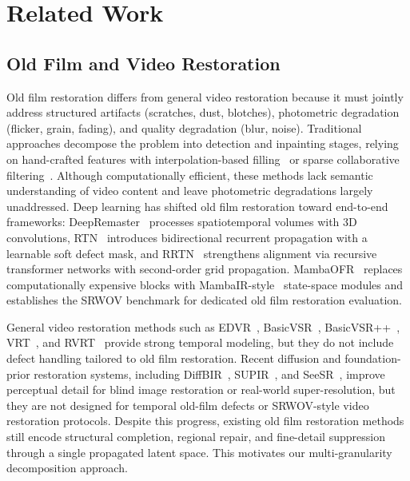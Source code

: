 \section{Related Work}
\label{sec:related}

\subsection{Old Film and Video Restoration}
\label{subsec:ofr}

Old film restoration differs from general video restoration because it must jointly address structured artifacts (scratches, dust, blotches), photometric degradation (flicker, grain, fading), and quality degradation (blur, noise). Traditional approaches decompose the problem into detection and inpainting stages, relying on hand-crafted features with interpolation-based filling~\cite{kokaram2004missing} or sparse collaborative filtering~\cite{dabov2007bm3d,he2013guided}. Although computationally efficient, these methods lack semantic understanding of video content and leave photometric degradations largely unaddressed. Deep learning has shifted old film restoration toward end-to-end frameworks: DeepRemaster~\cite{iizuka2019deepremaster} processes spatiotemporal volumes with 3D convolutions, RTN~\cite{wan2022rtn} introduces bidirectional recurrent propagation with a learnable soft defect mask, and RRTN~\cite{lin2024rrtn} strengthens alignment via recursive transformer networks with second-order grid propagation. MambaOFR~\cite{mao2025mambaofr} replaces computationally expensive blocks with MambaIR-style~\cite{guo2024mambair} state-space modules and establishes the SRWOV benchmark for dedicated old film restoration evaluation.

General video restoration methods such as EDVR~\cite{wang2019edvr}, BasicVSR~\cite{chan2021basicvsr}, BasicVSR++~\cite{chan2022basicvsrpp}, VRT~\cite{liang2024vrt}, and RVRT~\cite{liang2022rvrt} provide strong temporal modeling, but they do not include defect handling tailored to old film restoration. Recent diffusion and foundation-prior restoration systems, including DiffBIR~\cite{lin2024diffbir}, SUPIR~\cite{yu2024supir}, and SeeSR~\cite{wu2024seesr}, improve perceptual detail for blind image restoration or real-world super-resolution, but they are not designed for temporal old-film defects or SRWOV-style video restoration protocols. Despite this progress, existing old film restoration methods still encode structural completion, regional repair, and fine-detail suppression through a single propagated latent space. This motivates our multi-granularity decomposition approach.

